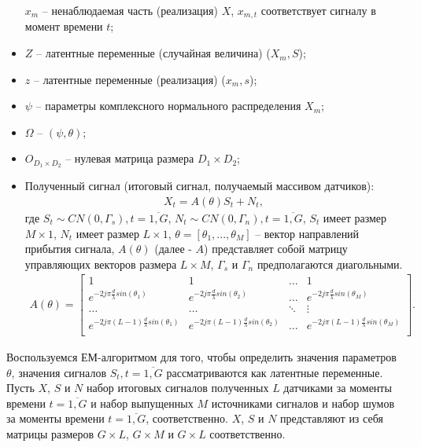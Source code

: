 \documentclass[11pt]{article}
\begin{document}
\begin{itemize}
$x_m$ -- ненаблюдаемая часть (реализация) $X$, $x_{m,t}$ соответствует сигналу в момент времени $t$;
\item
$Z$ -- латентные переменные (случайная величина) ($X_m, S$);
\item
$z$ -- латентные переменные (реализация) ($x_m, s$);
\item
$\psi$ -- параметры комплексного нормального распределения $X_m$;
\item
$\Omega$ -- $(\psi, \theta)$;
\item
$O_{D_1 \times D_2}$ -- нулевая матрица размера $D_1 \times D_2$;
\item
Полученный сигнал (итоговый сигнал, получаемый массивом датчиков):
\begin{equation}
\begin{gathered}
X_t=A(\theta)S_t+N_t,
\end{gathered}
\end{equation}
где $S_t \sim CN(0,\Gamma_s),t=\overline{1,G}$, $N_t \sim CN(0,\Gamma_n), t=\overline{1,G}$, $S_t$ имеет размер $M \times 1$,  $N_t$ имеет размер $L \times 1$, $\theta=[\theta_1,...,\theta_M]$ -- вектор направлений прибытия сигнала, $A(\theta)$ (далее - $A$) представляет собой матрицу управляющих векторов размера $L \times M$, $\Gamma_s$ и $\Gamma_n$ предполагаются диагольными.
\begin{gather}
A(\theta) = \begin{bmatrix}
1&1&\dots&1\\
e^{-2j\pi \frac{d}{\lambda}sin(\theta_1)}& e^{-2j\pi \frac{d}{\lambda}sin(\theta_2)}&\dots&e^{-2j\pi \frac{d}{\lambda}sin(\theta_M)}\\
\dots&\dots&\ddots&\vdots\\
e^{-2j\pi (L-1) \frac{d}{\lambda}sin(\theta_1)}& e^{-2j\pi (L-1) \frac{d}{\lambda}sin(\theta_2)}&\dots&e^{-2j\pi (L-1) \frac{d}{\lambda}sin(\theta_M)}\\
\end{bmatrix}.
\nonumber
\end{gather}
\end{itemize}
Воспользуемся ЕМ-алгоритмом для того, чтобы определить значения параметров $\theta$, значения сигналов $S_t, t=\overline{1,G}$ рассматриваются как латентные переменные. 
Пусть $X$, $S$ и $N$ набор итоговых сигналов полученных $L$ датчиками за моменты времени $t=\overline{1,G}$ и набор выпущенных $M$ источниками сигналов и набор шумов за моменты времени $t=\overline{1,G}$, соответственно. $X$, $S$ и $N$ представляют из себя матрицы размеров $G \times L$, $G \times M$ и $G \times L$ соответственно.
\end{document}
